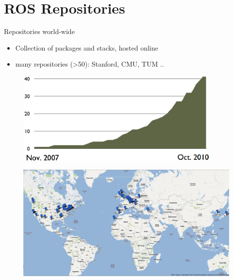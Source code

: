 \lyxframeend{}


\lyxframeend{}\section{ROS Repositories}


\lyxframeend{}

Repositories world-wide
\begin{itemize}
\item Collection of packages and stacks, hosted online
\item many repositories (>50): Stanford, CMU, TUM ..
\end{itemize}
\noindent \begin{center}
\begin{figure}[H]
\noindent \centering{}\includegraphics[width=0.9\textwidth]{images/ROSReopGrowth}
\end{figure}

\par\end{center}


\lyxframeend{}


\lyxframeend{}

\noindent \begin{center}
\begin{figure}[H]
\noindent \centering{}\includegraphics[bb=80bp 0bp 1350bp 550bp,width=1\paperwidth]{images/ROS_Repositories}
\end{figure}

\par\end{center}


